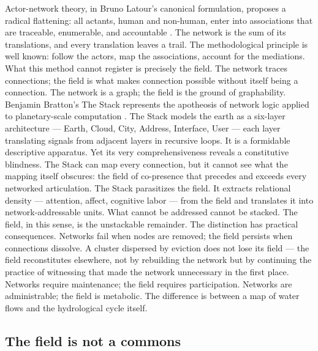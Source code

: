 Actor-network theory, in Bruno Latour's canonical formulation, proposes a radical flattening: all actants, human and non-human, enter into associations that are traceable, enumerable, and accountable \cite{latour_2005}. The network is the sum of its translations, and every translation leaves a trail. The methodological principle is well known: follow the actors, map the associations, account for the mediations. What this method cannot register is precisely the field. The network traces connections; the field is what makes connection possible without itself being a connection. The network is a graph; the field is the ground of graphability. Benjamin Bratton’s The Stack represents the apotheosis of network logic applied to planetary-scale computation \cite{bratton_2015}. The Stack models the earth as a six-layer architecture — Earth, Cloud, City, Address, Interface, User — each layer translating signals from adjacent layers in recursive loops. It is a formidable descriptive apparatus. Yet its very comprehensiveness reveals a constitutive blindness. The Stack can map every connection, but it cannot see what the mapping itself obscures: the field of co-presence that precedes and exceeds every networked articulation. The Stack parasitizes the field. It extracts relational density — attention, affect, cognitive labor — from the field and translates it into network-addressable units. What cannot be addressed cannot be stacked. The field, in this sense, is the unstackable remainder. The distinction has practical consequences. Networks fail when nodes are removed; the field persists when connections dissolve. A cluster dispersed by eviction does not lose its field — the field reconstitutes elsewhere, not by rebuilding the network but by continuing the practice of witnessing that made the network unnecessary in the first place. Networks require maintenance; the field requires participation. Networks are administrable; the field is metabolic. The difference is between a map of water flows and the hydrological cycle itself.

\subsection{The field is not a commons}

